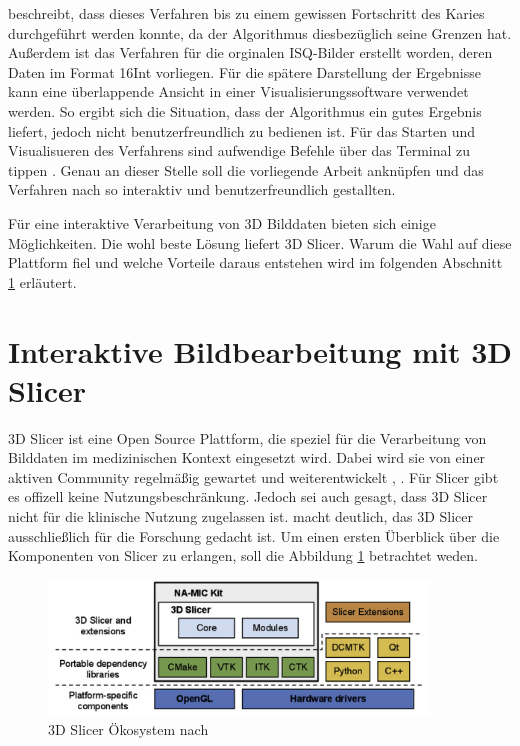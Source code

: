 \citet{hoffmann2020} beschreibt, dass dieses Verfahren bis zu einem gewissen Fortschritt
des Karies durchgeführt werden konnte, da der Algorithmus diesbezüglich seine
Grenzen hat. Außerdem ist das Verfahren für die orginalen \ac{ISQ}-Bilder
erstellt worden, deren Daten im Format \ac{16Int} vorliegen. Für die spätere Darstellung
der Ergebnisse kann eine überlappende Ansicht in einer Visualisierungssoftware verwendet
werden. So ergibt sich die Situation, dass der Algorithmus ein gutes Ergebnis liefert,
jedoch nicht benutzerfreundlich zu bedienen ist. Für das Starten und Visualisueren
des Verfahrens sind aufwendige Befehle über das Terminal zu tippen \citep[vgl.][Seite
53]{hoffmann2020}. Genau an dieser Stelle soll die vorliegende Arbeit anknüpfen
und das Verfahren nach \citet{hoffmann2020} so interaktiv und benutzerfreundlich
gestallten.

Für eine interaktive Verarbeitung von 3D Bilddaten bieten sich einige Möglichkeiten.
Die wohl beste Lösung liefert 3D Slicer. Warum die Wahl auf diese Plattform fiel
und welche Vorteile daraus entstehen wird im folgenden Abschnitt \ref{sec:3d_slicer}
erläutert.

\section{Interaktive Bildbearbeitung mit 3D Slicer}
\label{sec:3d_slicer} 3D Slicer ist eine Open Source Plattform, die speziel für
die Verarbeitung von Bilddaten im medizinischen Kontext eingesetzt wird. Dabei wird
sie von einer aktiven Community regelmäßig gewartet und weiterentwickelt \citep[vgl.][]{slicer2024},
\citep[vgl.][]{fedorov2012slicer}. Für Slicer gibt es offizell keine Nutzungsbeschränkung.
Jedoch sei auch gesagt, dass 3D Slicer nicht für die klinische Nutzung zugelassen
ist. \citet{fedorov2012slicer} macht deutlich, das 3D Slicer ausschließlich für
die Forschung gedacht ist. Um einen ersten Überblick über die Komponenten von Slicer
zu erlangen, soll die Abbildung \ref{fig:3d_slicer_oekosystem} betrachtet weden.

\begin{figure}[h]
	\centering
	\includegraphics[width=0.9\textwidth]{img/3d_slicer_overview.jpg}
	\caption{3D Slicer Ökosystem nach \citet[Seite 1326]{fedorov2012slicer}}
	\label{fig:3d_slicer_oekosystem}
\end{figure}

